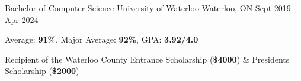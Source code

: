 
\begin{cventries}
  \cventry
    {Bachelor of Computer Science} %
    {University of Waterloo} %
    {Waterloo, ON} %
    {Sept 2019 - Apr 2024} %
    {
      \begin{cvitems} %
        \item{Average: \textbf{91\%}, Major Average: \textbf{92\%}, GPA: \textbf{3.92/4.0}}
        \item {Recipient of the Waterloo County Entrance Scholarship (\textbf{\$4000}) \& President\textquotesingle s Scholarship (\textbf{\$2000})}
      \end{cvitems}
    }
\end{cventries}
